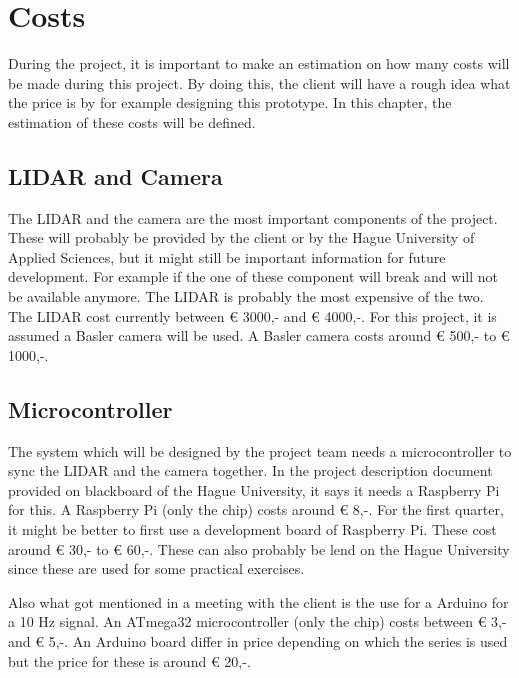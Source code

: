 \chapter{Costs}
\justify
During the project, it is important to make an estimation on how many costs will be made during this project. By doing this, the client will have a rough idea what the price is by for example designing this prototype.  In this chapter, the estimation of these costs will be defined.

\section{LIDAR and Camera}
\justify
The LIDAR and the camera are the most important components of the project. These will probably be provided by the client or by the Hague University of Applied Sciences, but it might still be important information for future development. For example if the one of these component will break and will not be available anymore. The LIDAR is probably the most expensive of the two. The LIDAR cost currently between € 3000,- and € 4000,-. For this project, it is assumed a Basler camera will be used. A Basler camera costs around € 500,- to € 1000,-. 

\section{Microcontroller}
\justify
The system which will be designed by the project team needs a microcontroller to sync the LIDAR and the camera together. In the project description document provided on blackboard of the Hague University, it says it needs a Raspberry Pi for this. A Raspberry Pi (only the chip) costs around  € 8,-. For the first quarter, it might be better to first use a development board of Raspberry Pi. These cost around € 30,- to € 60,-. These can also probably be lend on the Hague University since these are used for some practical exercises.

\justify
Also what got mentioned in a meeting with the client is the use for a Arduino for a 10 Hz signal. An ATmega32 microcontroller (only the chip) costs between € 3,- and  € 5,-. An Arduino board differ in price depending on which the series is used but the price for these is around € 20,-.


